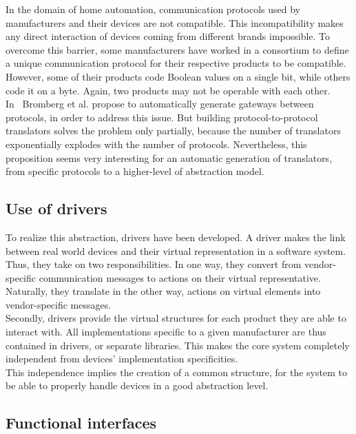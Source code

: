 In the domain of home automation, communication protocols used by manufacturers and their devices are not compatible. This incompatibility makes any direct interaction of devices coming from different brands impossible. To overcome this barrier, some manufacturers have worked in a consortium to define a unique communication protocol for their respective products to be compatible. However, some of their products code Boolean values on a single bit, while others code it on a byte. Again, two products may not be operable with each other.\\
In~\cite{Bromberg:2009} Bromberg et al. propose to automatically generate gateways between protocols, in order to address this issue. But building protocol-to-protocol translators solves the problem only partially, because the number of translators exponentially explodes with the number of protocols. Nevertheless, this proposition seems very interesting for an automatic generation of translators, from specific protocols to a higher-level of abstraction model.

\subsection{Use of drivers}
\label{subsec:useOfDrivers}
To realize this abstraction, drivers have been developed. A driver makes the link between real world devices and their virtual representation in a software system. Thus, they take on two responsibilities. In one way, they convert from vendor-specific communication messages to actions on their virtual representative. Naturally, they translate in the other way, actions on virtual elements into vendor-specific messages. \\
Secondly, drivers provide the virtual structures for each product they are able to interact with. All implementations specific to a given manufacturer are thus contained in drivers, or separate libraries. This makes the core system completely independent from devices' implementation specificities.\\

This independence implies the creation of a common structure, for the system to be able to properly handle devices in a good abstraction level.

\subsection{Functional interfaces}

